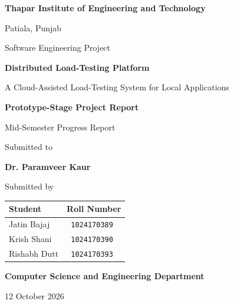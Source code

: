\documentclass[11pt,a4paper,oneside]{report}
\newcommand{\ReportDate}{12 October 2026}
\newcommand{\Advisor}{Dr. Paramveer Kaur}
\begin{document}

\hypersetup{pageanchor=false}

\begin{titlepage}
  \centering

  {\large\bfseries Thapar Institute of Engineering and Technology\par}
  \vspace{0.2cm}
  {\large Patiala, Punjab\par}

  \vspace{0.9cm}
  {\large Software Engineering Project\par}

  \vspace{1.1cm}
  {\Huge\bfseries Distributed Load-Testing Platform\par}

  \vspace{0.4cm}
  {\LARGE A Cloud-Assisted Load-Testing System for Local Applications\par}

  \vspace{0.8cm}
  {\Large\bfseries Prototype-Stage Project Report\par}

  \vspace{0.2cm}
  {\large Mid-Semester Progress Report\par}

  \vspace{1.2cm}
  {\large Submitted to\par}
  \vspace{0.15cm}
  {\Large\bfseries \Advisor\par}

  \vspace{1.0cm}
  {\large Submitted by\par}
  \vspace{0.3cm}

  \begin{tabular}{@{}ll@{}}
    \textbf{Student} & \textbf{Roll Number} \\
    \midrule
    Jatin Bajaj &   \texttt{   1024170389}\\
    Krish Shani &  \texttt{    1024170390} \\
    Rishabh Dutt&   \texttt{    1024170393}
  \end{tabular}

  \vfill

  {\large\bfseries Computer Science and Engineering Department\par}
  \vspace{0.4cm}
  {\large \ReportDate\par}

\end{titlepage}
\end{document}
